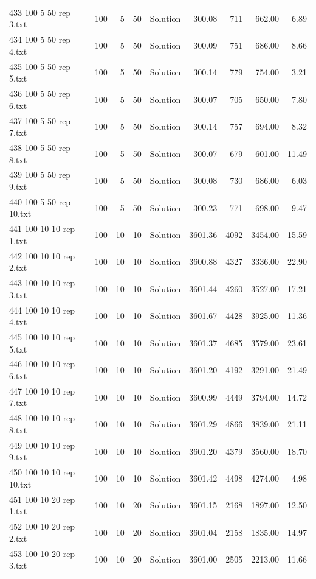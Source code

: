 \begin{longtable}{lrrllrrrr}
433 100 5 50 rep 3.txt & 100 & 5 & 50 & Solution & 300.08 & 711 & 662.00 &  6.89\\
434 100 5 50 rep 4.txt & 100 & 5 & 50 & Solution & 300.09 & 751 & 686.00 &  8.66\\
435 100 5 50 rep 5.txt & 100 & 5 & 50 & Solution & 300.14 & 779 & 754.00 &  3.21\\
436 100 5 50 rep 6.txt & 100 & 5 & 50 & Solution & 300.07 & 705 & 650.00 &  7.80\\
437 100 5 50 rep 7.txt & 100 & 5 & 50 & Solution & 300.14 & 757 & 694.00 &  8.32\\
438 100 5 50 rep 8.txt & 100 & 5 & 50 & Solution & 300.07 & 679 & 601.00 & 11.49\\
439 100 5 50 rep 9.txt & 100 & 5 & 50 & Solution & 300.08 & 730 & 686.00 &  6.03\\
440 100 5 50 rep 10.txt & 100 & 5 & 50 & Solution & 300.23 & 771 & 698.00 &  9.47\\
441 100 10 10 rep 1.txt & 100 & 10 & 10 & Solution & 3601.36 & 4092 & 3454.00 & 15.59\\
442 100 10 10 rep 2.txt & 100 & 10 & 10 & Solution & 3600.88 & 4327 & 3336.00 & 22.90\\
443 100 10 10 rep 3.txt & 100 & 10 & 10 & Solution & 3601.44 & 4260 & 3527.00 & 17.21\\
444 100 10 10 rep 4.txt & 100 & 10 & 10 & Solution & 3601.67 & 4428 & 3925.00 & 11.36\\
445 100 10 10 rep 5.txt & 100 & 10 & 10 & Solution & 3601.37 & 4685 & 3579.00 & 23.61\\
446 100 10 10 rep 6.txt & 100 & 10 & 10 & Solution & 3601.20 & 4192 & 3291.00 & 21.49\\
447 100 10 10 rep 7.txt & 100 & 10 & 10 & Solution & 3600.99 & 4449 & 3794.00 & 14.72\\
448 100 10 10 rep 8.txt & 100 & 10 & 10 & Solution & 3601.29 & 4866 & 3839.00 & 21.11\\
449 100 10 10 rep 9.txt & 100 & 10 & 10 & Solution & 3601.20 & 4379 & 3560.00 & 18.70\\
450 100 10 10 rep 10.txt & 100 & 10 & 10 & Solution & 3601.42 & 4498 & 4274.00 &  4.98\\
451 100 10 20 rep 1.txt & 100 & 10 & 20 & Solution & 3601.15 & 2168 & 1897.00 & 12.50\\
452 100 10 20 rep 2.txt & 100 & 10 & 20 & Solution & 3601.04 & 2158 & 1835.00 & 14.97\\
453 100 10 20 rep 3.txt & 100 & 10 & 20 & Solution & 3601.00 & 2505 & 2213.00 & 11.66\\

\end{longtable}
